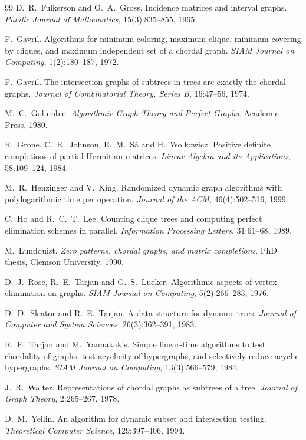 \documentclass[11pt,a4paper,oneside]{report}
\theoremstyle{plain}
\theoremstyle{definition}
\theoremstyle{remark}
\begin{document}
\begin{thebibliography}{99}
 D.~R.~Fulkerson and O.~A.~Gross. Incidence matrices and interval
graphs. \emph{Pacific Journal of Mathematics}, 15(3):835--855, 1965.

 F.~Gavril. Algorithms for minimum coloring, maximum clique, minimum
covering by cliques, and maximum independent set of a chordal graph. \emph{SIAM Journal on
Computing}, 1(2):180--187, 1972.

 F.~Gavril. The intersection graphs of subtrees in trees are exactly the
chordal graphs. \emph{Journal of Combinatorial Theory, Series B}, 16:47--56, 1974.

 M.~C.~Golumbic. \emph{Algorithmic Graph Theory and Perfect Graphs}.
Academic Press, 1980.

 R.~Grone, C.~R.~Johnson, E.~M.~S\'a and H.~Wolkowicz. Positive definite
completions of partial Hermitian matrices. \emph{Linear Algebra and its Applications},
58:109--124, 1984.

 M.~R.~Henzinger and V.~King. Randomized dynamic graph algorithms with
polylogarithmic time per operation. \emph{Journal of the ACM}, 46(4):502--516, 1999.

 C.~Ho and R.~C.~T.~Lee. Counting clique trees and computing perfect
elimination schemes in parallel. \emph{Information Processing Letters}, 31:61--68, 1989.

 M.~Lundquist. \emph{Zero patterns, chordal graphs, and matrix
completions}. PhD thesis, Clemson University, 1990.

 D.~J.~Rose, R.~E.~Tarjan and G.~S.~Lueker. Algorithmic aspects of vertex
elimination on graphs. \emph{SIAM Journal on Computing}, 5(2):266--283, 1976.

 D.~D.~Sleator and R.~E.~Tarjan. A data structure for dynamic trees.
\emph{Journal of Computer and System Sciences}, 26(3):362--391, 1983.

 R.~E.~Tarjan and M.~Yannakakis. Simple linear-time algorithms to test
chordality of graphs, test acyclicity of hypergraphs, and selectively reduce acyclic
hypergraphs. \emph{SIAM Journal on Computing}, 13(3):566--579, 1984.

 J.~R.~Walter. Representations of chordal graphs as subtrees of a tree.
\emph{Journal of Graph Theory}, 2:265--267, 1978.

 D.~M.~Yellin. An algorithm for dynamic subset and intersection testing.
\emph{Theoretical Computer Science}, 129:397--406, 1994.

\end{thebibliography}
\appendix
{}
\end{document}
